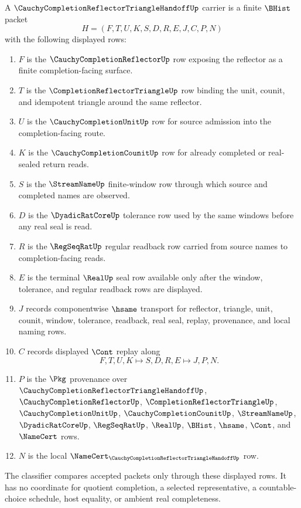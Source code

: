 \begin{definition}
\label{def:cauchy-completion-reflector-triangle-handoff-carrier}
A $\CauchyCompletionReflectorTriangleHandoffUp$ carrier is a finite $\BHist$ packet
$$
H=(F,T,U,K,S,D,R,E,J,C,P,N)
$$
with the following displayed rows:
\begin{enumerate}
\item $F$ is the $\CauchyCompletionReflectorUp$ row exposing the reflector as a finite completion-facing surface.
\item $T$ is the $\CompletionReflectorTriangleUp$ row binding the unit, counit, and idempotent triangle around the same reflector.
\item $U$ is the $\CauchyCompletionUnitUp$ row for source admission into the completion-facing route.
\item $K$ is the $\CauchyCompletionCounitUp$ row for already completed or real-sealed return reads.
\item $S$ is the $\StreamNameUp$ finite-window row through which source and completed names are observed.
\item $D$ is the $\DyadicRatCoreUp$ tolerance row used by the same windows before any real seal is read.
\item $R$ is the $\RegSeqRatUp$ regular readback row carried from source names to completion-facing reads.
\item $E$ is the terminal $\RealUp$ seal row available only after the window, tolerance, and regular readback rows are displayed.
\item $J$ records componentwise $\hsame$ transport for reflector, triangle, unit, counit, window, tolerance, readback, real seal, replay, provenance, and local naming rows.
\item $C$ records displayed $\Cont$ replay along
$$
F,T,U,K \longmapsto S,D,R,E \longmapsto J,P,N .
$$
\item $P$ is the $\Pkg$ provenance over $\CauchyCompletionReflectorTriangleHandoffUp$, $\CauchyCompletionReflectorUp$, $\CompletionReflectorTriangleUp$, $\CauchyCompletionUnitUp$, $\CauchyCompletionCounitUp$, $\StreamNameUp$, $\DyadicRatCoreUp$, $\RegSeqRatUp$, $\RealUp$, $\BHist$, $\hsame$, $\Cont$, and $\NameCert$ rows.
\item $N$ is the local $\NameCert_{\CauchyCompletionReflectorTriangleHandoffUp}$ row.
\end{enumerate}
The classifier compares accepted packets only through these displayed rows. It has no coordinate for quotient completion, a selected representative, a countable-choice schedule, host equality, or ambient real completeness.
\end{definition}

